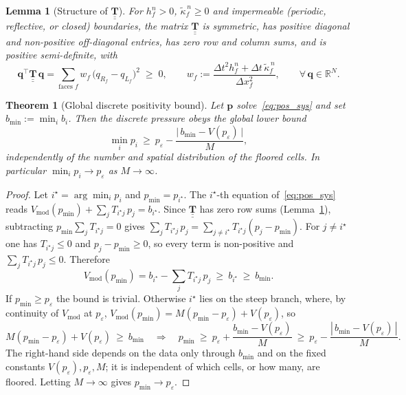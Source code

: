 \documentclass[10pt,a4paper]{amsart}
\newtheorem{lemma}{Lemma}
\newtheorem{theorem}{Theorem}
\begin{document}
\begin{lemma}[Structure of $\underline{\underline{\mathbf{T}}}$]
\label{lem:pos_T}
For $h^{n}_{f}>0$, $\tilde{\kappa}^{\,n}_{f}\ge 0$ and impermeable (periodic,
reflective, or closed) boundaries, the matrix $\underline{\underline{\mathbf{T}}}$ is symmetric, has
positive diagonal and non-positive off-diagonal entries, has zero row and
column sums, and is positive semi-definite, with
\begin{equation}
\label{eq:pos_quadform}
\mathbf{q}^{\top}\underline{\underline{\mathbf{T}}}\,\mathbf{q}
 =\sum_{\text{faces }f} w_{f}\,\bigl(q_{R_{f}}-q_{L_{f}}\bigr)^{2}\;\ge\;0,
\qquad
w_{f}:=\frac{\Delta t^{2}h^{n}_{f}+\Delta t\,\tilde{\kappa}^{\,n}_{f}}
            {\Delta x_{f}^{2}},
\qquad\forall\,\mathbf{q}\in\mathbb{R}^{N}.
\end{equation}
\end{lemma}

\begin{theorem}[Global discrete positivity bound]
\label{thm:pos_global}
Let $\mathbf{p}$ solve~\eqref{eq:pos_sys} and set $b_{\min}:=\min_i b_i$. Then the
discrete pressure obeys the global lower bound
\begin{equation}
\label{eq:pos_global_bound}
\min_i p_i\ \ge\ p_{\varepsilon}
-\frac{\big|\,b_{\min}-V(p_{\varepsilon})\,\big|}{M},
\end{equation}
\emph{independently of the number and spatial distribution of the floored cells}. In
particular $\min_i p_i\to p_{\varepsilon}$ as $M\to\infty$.
\end{theorem}

\begin{proof}
Let $i^{\star}=\arg\min_i p_i$ and $p_{\min}=p_{i^{\star}}$. The $i^{\star}$-th equation
of~\eqref{eq:pos_sys} reads
$V_{\mathrm{mod}}(p_{\min})+\sum_j T_{i^{\star}j}\,p_j=b_{i^{\star}}$. Since
$\underline{\underline{\mathbf{T}}}$ has zero row sums (Lemma~\ref{lem:pos_T}),
subtracting $p_{\min}\sum_j T_{i^{\star}j}=0$ gives
$\sum_j T_{i^{\star}j}\,p_j=\sum_{j\neq i^{\star}}T_{i^{\star}j}(p_j-p_{\min})$. For
$j\neq i^{\star}$ one has $T_{i^{\star}j}\le 0$ and $p_j-p_{\min}\ge 0$, so every term is
non-positive and $\sum_j T_{i^{\star}j}\,p_j\le 0$. Therefore
\begin{equation}
V_{\mathrm{mod}}(p_{\min})=b_{i^{\star}}-\sum_j T_{i^{\star}j}\,p_j
\ \ge\ b_{i^{\star}}\ \ge\ b_{\min}.
\end{equation}
If $p_{\min}\ge p_{\varepsilon}$ the bound is trivial. Otherwise $i^{\star}$ lies on the
steep branch, where, by continuity of $V_{\mathrm{mod}}$ at $p_{\varepsilon}$,
$V_{\mathrm{mod}}(p_{\min})=M(p_{\min}-p_{\varepsilon})+V(p_{\varepsilon})$, so
\begin{equation}
M(p_{\min}-p_{\varepsilon})+V(p_{\varepsilon})\ \ge\ b_{\min}
\quad\Longrightarrow\quad
p_{\min}\ \ge\ p_{\varepsilon}+\frac{b_{\min}-V(p_{\varepsilon})}{M}
\ \ge\ p_{\varepsilon}-\frac{|\,b_{\min}-V(p_{\varepsilon})\,|}{M}.
\end{equation}
The right-hand side depends on the data only through $b_{\min}$ and on the fixed
constants $V(p_{\varepsilon}),p_{\varepsilon},M$; it is independent of which cells, or
how many, are floored. Letting $M\to\infty$ gives $p_{\min}\to p_{\varepsilon}$.
\end{proof}
\end{document}
